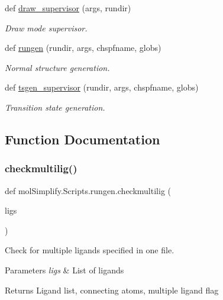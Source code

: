 \begin{DoxyCompactItemize}
def \hyperlink{namespacemolSimplify_1_1Scripts_1_1rungen_a22df8ce169a6b5a681188eb023ff2d42}{draw\+\_\+supervisor} (args, rundir)
\begin{DoxyCompactList}\small\item\em Draw mode supervisor. \end{DoxyCompactList}\item 
def \hyperlink{namespacemolSimplify_1_1Scripts_1_1rungen_ab26f673a04ed35da4dd42e25a000b7b8}{rungen} (rundir, args, chspfname, globs)
\begin{DoxyCompactList}\small\item\em Normal structure generation. \end{DoxyCompactList}\item 
def \hyperlink{namespacemolSimplify_1_1Scripts_1_1rungen_a6f13dbc9028ee4a798acb80f7f39669b}{tsgen\+\_\+supervisor} (rundir, args, chspfname, globs)
\begin{DoxyCompactList}\small\item\em Transition state generation. \end{DoxyCompactList}\end{DoxyCompactItemize}


\subsection{Function Documentation}
\mbox{\label{namespacemolSimplify_1_1Scripts_1_1rungen_aeed4f28deecb6df6f25668fe01cb09d5}} 
\subsubsection{\texorpdfstring{checkmultilig()}{checkmultilig()}}
{\footnotesize\ttfamily def mol\+Simplify.\+Scripts.\+rungen.\+checkmultilig (\begin{DoxyParamCaption}\item[{}]{ligs }\end{DoxyParamCaption})}



Check for multiple ligands specified in one file. 


\begin{DoxyParams}{Parameters}
{\em ligs} & List of ligands \\
\hline
\end{DoxyParams}
\begin{DoxyReturn}{Returns}
Ligand list, connecting atoms, multiple ligand flag 
\end{DoxyReturn}
\mbox{\label{namespacemolSimplify_1_1Scripts_1_1rungen_a11050086ca9b1adb58378df39d8da2ac}} 

